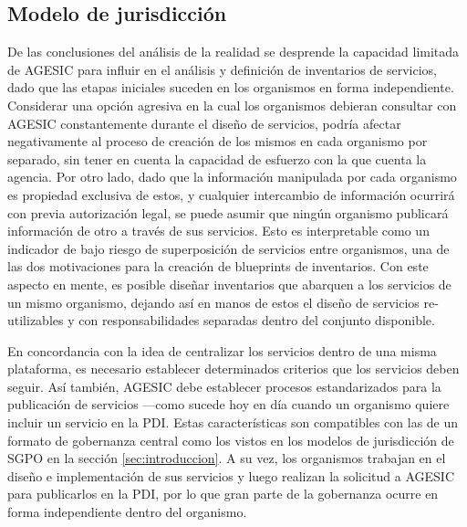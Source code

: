 \documentclass[11pt]{article}
\begin{document}
		\subsection{Modelo de jurisdicción}
			\label{subsec:modelo_de_jurisdiccion}
			De las conclusiones del análisis de la realidad se desprende la capacidad limitada de AGESIC para influir en el análisis y definición de inventarios de servicios, dado que las etapas iniciales suceden en los organismos en forma independiente. Considerar una opción agresiva en la cual los organismos debieran consultar con AGESIC constantemente durante el diseño de servicios, podría afectar negativamente al proceso de creación de los mismos en cada organismo por separado, sin tener en cuenta la capacidad de esfuerzo con la que cuenta la agencia. Por otro lado, dado que la información manipulada por cada organismo es propiedad exclusiva de estos, y cualquier intercambio de información ocurrirá con previa autorización legal, se puede asumir que ningún organismo publicará información de otro a través de sus servicios. Esto es interpretable como un indicador de bajo riesgo de superposición de servicios entre organismos, una de las dos motivaciones para la creación de blueprints de inventarios. Con este aspecto en mente, es posible diseñar inventarios que abarquen a los servicios de un mismo organismo, dejando así en manos de estos el diseño de servicios re-utilizables y con responsabilidades separadas dentro del conjunto disponible.

			En concordancia con la idea de centralizar los servicios dentro de una misma plataforma, es necesario establecer determinados criterios que los servicios deben seguir. Así también, AGESIC debe establecer procesos estandarizados para la publicación de servicios —como sucede hoy en día cuando un organismo quiere incluir un servicio en la PDI. Estas características son compatibles con las de un formato de gobernanza central como los vistos en los modelos de jurisdicción de SGPO en la sección \ref{sec:introduccion}. A su vez, los organismos trabajan en el diseño e implementación de sus servicios y luego realizan la solicitud a AGESIC para publicarlos en la PDI, por lo que gran parte de la gobernanza ocurre en forma independiente dentro del organismo.
\end{document}
